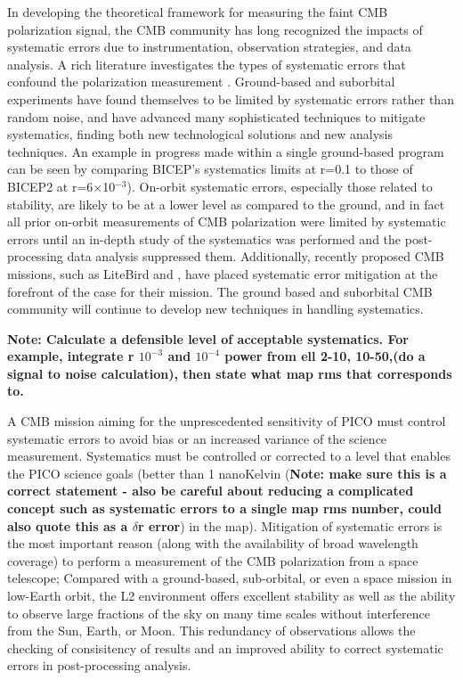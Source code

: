 \documentclass[PICOReport.tex]{subfiles}
\begin{document}
%
%


In developing the theoretical framework for measuring the faint CMB
polarization signal, the CMB community has long recognized the impacts
of systematic errors due to instrumentation, observation strategies, and data analysis.   
A rich literature investigates the types of
systematic errors that confound the polarization measurement \cite{hu03}. 
Ground-based and suborbital experiments have found themselves to be limited by systematic errors rather than random noise, and have advanced many sophisticated techniques to mitigate systematics, finding both new technological solutions and new analysis techniques.
An example in progress made within a single ground-based program can be seen by comparing BICEP's systematics limits at r=0.1\cite{Takahaski2010} to those of BICEP2 at r=6$\times$10$^{-3}$\cite{BICEP2_III}).
On-orbit systematic errors, especially those related to stability,  are likely to be at a lower level as compared to the ground, and in fact all prior on-orbit measurements of CMB polarization were limited by systematic errors until an in-depth study of the systematics was performed and the post-processing data analysis suppressed them\cite{Bennett13,planck2016_xlvi}. 
Additionally, recently proposed CMB missions, such as LiteBird and \core, have placed
systematic error mitigation at the forefront of the case for their
mission\cite{hazumi2012,wallis2017,Natoli2018}.
The ground based and suborbital CMB community will continue to develop new techniques in handling systematics.

\textbf{Note: Calculate a defensible level of acceptable systematics.
For example, integrate r $10^{-3}$ and $10^{-4}$ power from ell 2-10, 10-50,(do a signal to
noise calculation), then state what map rms that corresponds to.  }

A CMB mission aiming for the unprescedented sensitivity of PICO must control
systematic errors to avoid bias or an increased variance of the
science measurement.   
Systematics must be controlled or corrected to a level that enables the PICO
science goals (better than 1 nanoKelvin (\textbf{Note: make sure this is a
  correct statement - also be careful about reducing a complicated
  concept such as systematic errors to a single map rms number, could also
  quote this as a $\delta$r error}) in the map).
Mitigation of systematic errors is the most important reason (along
with the availability of broad wavelength coverage) to perform a
measurement of the CMB polarization from a space telescope; Compared
with a ground-based, sub-orbital, or even a space mission in 
low-Earth orbit, the L2 environment offers excellent stability as well
as the ability to observe large fractions of the sky on many time
scales without interference from the Sun, Earth, or Moon.
This redundancy of observations allows the checking of consisitency of
results and an improved ability to correct systematic errors in
post-processing analysis.
\end{document}
